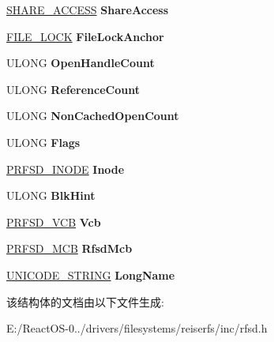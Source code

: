 \begin{DoxyCompactItemize}
\hyperlink{struct___s_h_a_r_e___a_c_c_e_s_s}{S\+H\+A\+R\+E\+\_\+\+A\+C\+C\+E\+SS} {\bfseries Share\+Access}
\item 
\mbox{\label{struct___r_f_s_d___f_c_b_acbc85fdecab87c87b8fa870239213eea}} 
\hyperlink{struct___f_i_l_e___l_o_c_k}{F\+I\+L\+E\+\_\+\+L\+O\+CK} {\bfseries File\+Lock\+Anchor}
\item 
\mbox{\label{struct___r_f_s_d___f_c_b_a99af7603fca8a4694aa05243a6efa73a}} 
U\+L\+O\+NG {\bfseries Open\+Handle\+Count}
\item 
\mbox{\label{struct___r_f_s_d___f_c_b_aa8d127360a2b5f59621608e3b576e28b}} 
U\+L\+O\+NG {\bfseries Reference\+Count}
\item 
\mbox{\label{struct___r_f_s_d___f_c_b_aa2659eecfed6353d9e398ea735973564}} 
U\+L\+O\+NG {\bfseries Non\+Cached\+Open\+Count}
\item 
\mbox{\label{struct___r_f_s_d___f_c_b_aaa2d1bfbf48982823886ae4619bab349}} 
U\+L\+O\+NG {\bfseries Flags}
\item 
\mbox{\label{struct___r_f_s_d___f_c_b_a4e847394e960471e7195d3c1a4883482}} 
\hyperlink{structstat__data}{P\+R\+F\+S\+D\+\_\+\+I\+N\+O\+DE} {\bfseries Inode}
\item 
\mbox{\label{struct___r_f_s_d___f_c_b_ae4598bcb747f0fd2d3ea5a620fe67a1f}} 
U\+L\+O\+NG {\bfseries Blk\+Hint}
\item 
\mbox{\label{struct___r_f_s_d___f_c_b_a30de79254e2432e68900c2a916336fef}} 
\hyperlink{struct___r_f_s_d___v_c_b}{P\+R\+F\+S\+D\+\_\+\+V\+CB} {\bfseries Vcb}
\item 
\mbox{\label{struct___r_f_s_d___f_c_b_ad9624df4c250a949e7c56707f3374482}} 
\hyperlink{struct___r_f_s_d___m_c_b}{P\+R\+F\+S\+D\+\_\+\+M\+CB} {\bfseries Rfsd\+Mcb}
\item 
\mbox{\label{struct___r_f_s_d___f_c_b_a54ac02801be3f67d2405700500226d54}} 
\hyperlink{struct___u_n_i_c_o_d_e___s_t_r_i_n_g}{U\+N\+I\+C\+O\+D\+E\+\_\+\+S\+T\+R\+I\+NG} {\bfseries Long\+Name}
\end{DoxyCompactItemize}


该结构体的文档由以下文件生成\+:\begin{DoxyCompactItemize}
\item 
E\+:/\+React\+O\+S-\/0../drivers/filesystems/reiserfs/inc/rfsd.\+h\end{DoxyCompactItemize}
